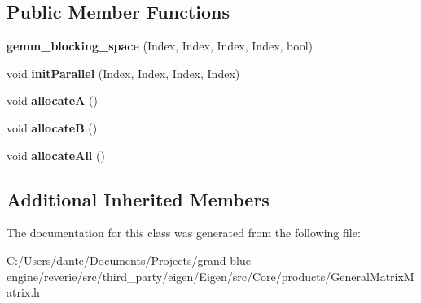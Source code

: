 \subsection*{Public Member Functions}
\begin{DoxyCompactItemize}
\item 
\mbox{\label{class_eigen_1_1internal_1_1gemm__blocking__space_3_01_storage_order_00_01___lhs_scalar_00_01___reb401dd40e11c548a7d5e4b85e19f682_a55d1ad4838574f9bbdbc22e7b0e3de32}} 
{\bfseries gemm\+\_\+blocking\+\_\+space} (Index, Index, Index, Index, bool)
\item 
\mbox{\label{class_eigen_1_1internal_1_1gemm__blocking__space_3_01_storage_order_00_01___lhs_scalar_00_01___reb401dd40e11c548a7d5e4b85e19f682_ab7921b50e4fe872d77ca9dde5cab1477}} 
void {\bfseries init\+Parallel} (Index, Index, Index, Index)
\item 
\mbox{\label{class_eigen_1_1internal_1_1gemm__blocking__space_3_01_storage_order_00_01___lhs_scalar_00_01___reb401dd40e11c548a7d5e4b85e19f682_aa610ce57a79ee71bebbfbe4471a65bf3}} 
void {\bfseries allocateA} ()
\item 
\mbox{\label{class_eigen_1_1internal_1_1gemm__blocking__space_3_01_storage_order_00_01___lhs_scalar_00_01___reb401dd40e11c548a7d5e4b85e19f682_afac3160daee89bd1c7b99ff747051a38}} 
void {\bfseries allocateB} ()
\item 
\mbox{\label{class_eigen_1_1internal_1_1gemm__blocking__space_3_01_storage_order_00_01___lhs_scalar_00_01___reb401dd40e11c548a7d5e4b85e19f682_aae93a57246d70beb974ce612d9e243ad}} 
void {\bfseries allocate\+All} ()
\end{DoxyCompactItemize}
\subsection*{Additional Inherited Members}


The documentation for this class was generated from the following file\+:\begin{DoxyCompactItemize}
\item 
C\+:/\+Users/dante/\+Documents/\+Projects/grand-\/blue-\/engine/reverie/src/third\+\_\+party/eigen/\+Eigen/src/\+Core/products/General\+Matrix\+Matrix.\+h\end{DoxyCompactItemize}
